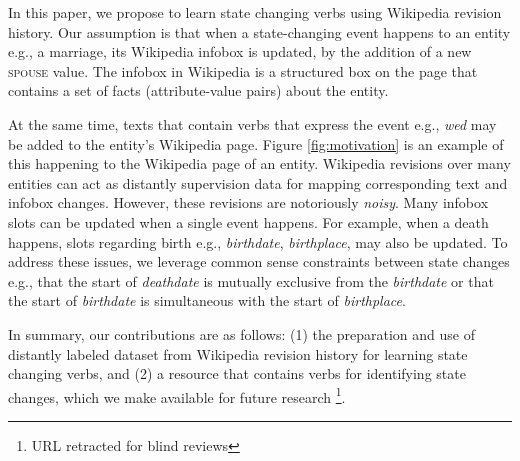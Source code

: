   

In this paper, we propose to learn state changing verbs using Wikipedia revision history. Our assumption is that when a state-changing event happens to an entity e.g., a marriage, its Wikipedia infobox is updated, by the addition of a new \textsc{spouse} value. The infobox in Wikipedia is  a structured box on the page that contains a set of facts (attribute-value pairs) about the entity. 

At the same time, texts that contain verbs that express the event e.g., \textit{wed} may be added to the entity's Wikipedia page.  Figure \ref{fig:motivation} is an example of this happening to the Wikipedia page of an entity. Wikipedia revisions over many entities can act as distantly supervision  data for mapping corresponding text and infobox changes. However, these revisions are notoriously  \textit{noisy}.  Many infobox slots can be  updated when a single event happens.
For example, when a death happens, slots regarding birth e.g., \textit{birthdate}, \textit{birthplace}, may also be updated. To address these issues, we leverage common sense constraints between state changes e.g., that the start of \textit{deathdate} is mutually exclusive from the \textit{birthdate} or that the start of \textit{birthdate} is simultaneous with the start of \textit{birthplace}.

In summary, our contributions are as follows: (1) the preparation and use of  distantly labeled dataset from Wikipedia revision history for learning state changing verbs, and (2) a resource that contains verbs for identifying state changes, which we make available for future research \footnote{URL retracted for blind reviews}.
